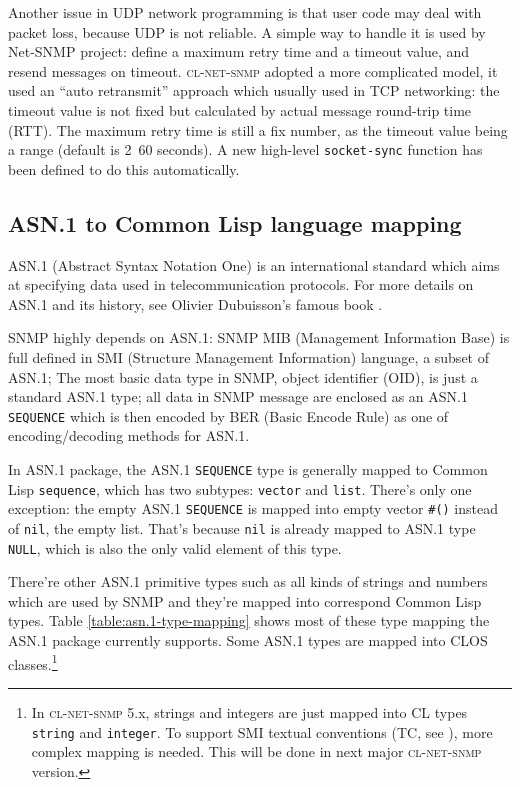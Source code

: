 \documentclass[reprint,9pt]{sigplanconf}
\begin{document}
Another issue in UDP network programming is that user code may deal
with packet loss, because UDP is not reliable. A simple way to handle
it is used by Net-SNMP project: define a maximum retry time
and a timeout value, and resend messages on timeout. \textsc{cl-net-snmp}
adopted a more complicated model, it used an ``auto retransmit''
approach \cite{Jacobson:RTT} which usually used in TCP networking: the
timeout value is not fixed but calculated by actual message round-trip
time (RTT). The maximum retry time is still a fix number, as the
timeout value being a range (default is 2~60 seconds). A new
high-level \texttt{socket-sync} function has been defined to do this
automatically.

\subsection{ASN.1 to Common Lisp language mapping}

ASN.1 (Abstract Syntax Notation One) \cite{ISO:ASN.1} is an
international standard which aims at specifying data used in
telecommunication protocols. For more details on ASN.1 and its
history, see Olivier Dubuisson's famous book \cite{Book:ASN.1}.

SNMP highly depends on ASN.1: SNMP MIB (Management Information Base)
\cite{RFC:3418} is full defined in SMI (Structure Management Information)
language, a subset of ASN.1; The most basic data type in SNMP, object identifier (OID),
is just a standard ASN.1 type; all data in SNMP message are enclosed as an ASN.1 \texttt{SEQUENCE} which is then
encoded by BER (Basic Encode Rule) as one of
encoding/decoding methods for ASN.1.

In ASN.1 package, the ASN.1 \texttt{SEQUENCE} type is generally mapped
to Common Lisp \texttt{sequence}, which has two subtypes: \texttt{vector}
and \texttt{list}.
There's only one exception: the empty ASN.1 \texttt{SEQUENCE} is
mapped into empty vector \texttt{\#()} instead of \texttt{nil}, the empty
list. That's because \texttt{nil} is already mapped to ASN.1 type \texttt{NULL},
which is also the only valid element of this type.

There're other ASN.1 primitive types such as all kinds of strings and numbers
which are used by SNMP and they're mapped into correspond Common Lisp types.
Table \ref{table:asn.1-type-mapping} shows most of these type mapping
the ASN.1 package currently supports. Some ASN.1 types are mapped
into CLOS classes.\footnote{In \textsc{cl-net-snmp} 5.x, strings and integers
are just mapped into CL types \texttt{string} and \texttt{integer}. To support
SMI textual conventions (TC, see \cite{RFC:2579}), more complex mapping is needed.
This will be done in next major \textsc{cl-net-snmp} version.}
\end{document}
